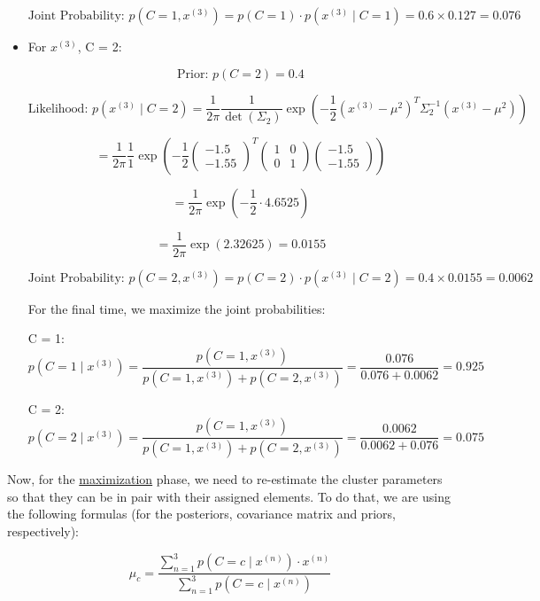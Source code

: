 \documentclass{article}
\begin{document}
\begin{itemize}
\[
\text{Joint Probability: } p(C = 1, x^{(3)}) = p(C = 1) \cdot p(x^{(3)} \mid C = 1) = 0.6 \times 0.127 = 0.076
\]

 \item[\textbullet] For \( x^{(3)} \), C = 2: 

\[
\text{Prior: } p(C = 2) = 0.4
\] 

\[
\text{Likelihood: } p \left( x^{(3)} \mid C = 2 \right) = \frac{1}{2\pi} \frac{1}{\det(\Sigma_2)} \exp \left( -\frac{1}{2} \left( x^{(3)} - \mu^2 \right)^T \Sigma_2^{-1} \left( x^{(3)} - \mu^2 \right) \right)
\]

\[
= \frac{1}{2\pi} \frac{1}{1} \exp \left( -\frac{1}{2} \begin{pmatrix} -1.5 \\ -1.55 \end{pmatrix}^T \begin{pmatrix} 1 & 0 \\ 0 & 1 \end{pmatrix} \begin{pmatrix} -1.5 \\ -1.55 \end{pmatrix} \right)
\]

\[
= \frac{1}{2\pi} \exp \left( -\frac{1}{2} \cdot 4.6525 \right) 
\]

\[
= \frac{1}{2\pi} \exp(2.32625) = 0.0155
\]

\[
\text{Joint Probability: } p(C = 2, x^{(3)}) = p(C = 2) \cdot p(x^{(3)} \mid C = 2) = 0.4 \times 0.0155 = 0.0062
\]

For the final time, we maximize the joint probabilities:

C = 1:
\[
p(C = 1 \mid x^{(3)}) = \frac{p(C = 1, x^{(3)})}{p(C = 1, x^{(3)}) + p(C = 2, x^{(3)})} = \frac{0.076}{0.076 + 0.0062} = 0.925
\]

C = 2:
\[
p(C = 2 \mid x^{(3)}) = \frac{p(C = 1, x^{(3)})}{p(C = 1, x^{(3)}) + p(C = 2, x^{(3)})} = \frac{0.0062}{0.0062 + 0.076} = 0.075
\]


\end{itemize}

\newpage

Now, for the \underline{maximization} phase, we need to re-estimate the cluster parameters so that they can be in pair with their assigned elements. To do that, we are using the following formulas (for the posteriors, covariance matrix and priors, respectively):

\[
\mu_c = \frac{\sum_{n=1}^{3} p(C = c \mid x^{(n)}) \cdot x^{(n)}}{\sum_{n=1}^{3} p(C = c \mid x^{(n)})}
\]
\end{document}

